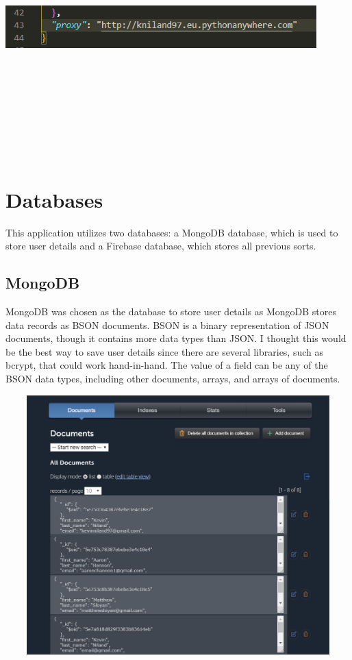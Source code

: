 \begin{center}
    \includegraphics[width=12cm,height=10cm,keepaspectratio]{images/proxy}
\end{center}

\section{Databases}
This application utilizes two databases: a MongoDB database, which is used to store user details and a Firebase database, which stores all previous sorts.

\subsection{MongoDB}
MongoDB was chosen as the database to store user details as MongoDB stores data records as BSON documents. BSON is a binary representation of JSON documents, though it contains more data types than JSON. I thought this would be the best way to save user details since there are several libraries, such as bcrypt, that could work hand-in-hand. The value of a field can be any of the BSON data types, including other documents, arrays, and arrays of documents. 

\begin{center}
    \includegraphics[width=15cm,height=10cm,keepaspectratio]{images/mlab}
\end{center}

